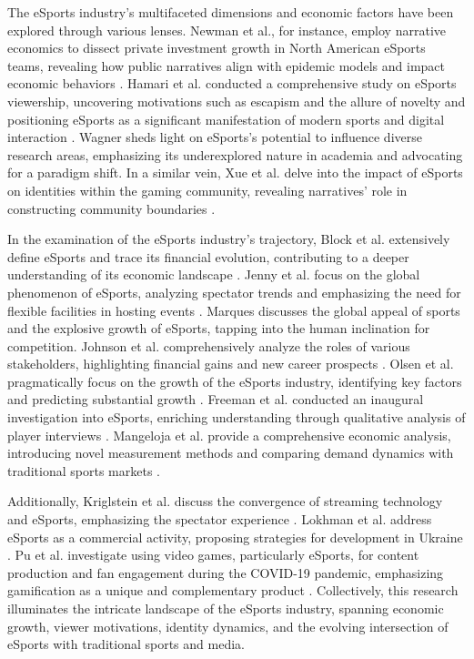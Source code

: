 \documentclass[manuscript,screen,review,anonymous]{acmart}
\begin{document}
The eSports industry's multifaceted dimensions and economic factors have been explored through various lenses. Newman et al., for instance, employ narrative economics to dissect private investment growth in North American eSports teams, revealing how public narratives align with epidemic models and impact economic behaviors \cite{a15}. Hamari et al. conducted a comprehensive study on eSports viewership, uncovering motivations such as escapism and the allure of novelty and positioning eSports as a significant manifestation of modern sports and digital interaction \cite{a4}. Wagner sheds light on eSports's potential to influence diverse research areas, emphasizing its underexplored nature in academia and advocating for a paradigm shift. In a similar vein, Xue et al. delve into the impact of eSports on identities within the gaming community, revealing narratives' role in constructing community boundaries \cite{a19}.

In the examination of the eSports industry's trajectory, Block et al. extensively define eSports and trace its financial evolution, contributing to a deeper understanding of its economic landscape \cite{a1}. Jenny et al. focus on the global phenomenon of eSports, analyzing spectator trends and emphasizing the need for flexible facilities in hosting events \cite{a5}. Marques discusses the global appeal of sports and the explosive growth of eSports, tapping into the human inclination for competition. Johnson et al. comprehensively analyze the roles of various stakeholders, highlighting financial gains and new career prospects \cite{a7}. Olsen et al. pragmatically focus on the growth of the eSports industry, identifying key factors and predicting substantial growth \cite{a16}. Freeman et al. conducted an inaugural investigation into eSports, enriching understanding through qualitative analysis of player interviews \cite{a3}. Mangeloja et al. provide a comprehensive economic analysis, introducing novel measurement methods and comparing demand dynamics with traditional sports markets \cite{a12}.

Additionally, Kriglstein et al. discuss the convergence of streaming technology and eSports, emphasizing the spectator experience \cite{a8}. Lokhman et al. address eSports as a commercial activity, proposing strategies for development in Ukraine \cite{a10}. Pu et al. investigate using video games, particularly eSports, for content production and fan engagement during the COVID-19 pandemic, emphasizing gamification as a unique and complementary product \cite{a18}. Collectively, this research illuminates the intricate landscape of the eSports industry, spanning economic growth, viewer motivations, identity dynamics, and the evolving intersection of eSports with traditional sports and media.
\end{document}
